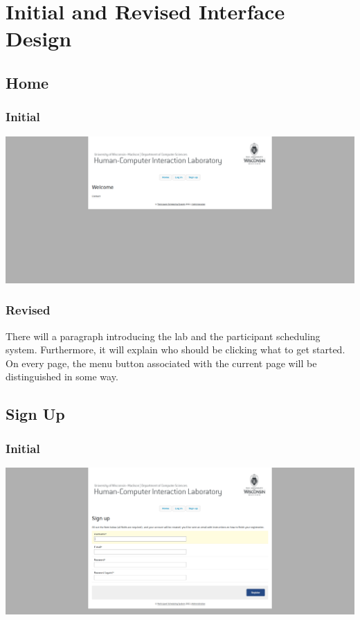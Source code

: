 \section{Initial and Revised Interface Design}

\subsection{Home}
\subsubsection{Initial}
\includegraphics[width=6in]{../other/initial-interface-design/home.png}
\subsubsection{Revised}
There will a paragraph introducing the lab and the participant scheduling system. Furthermore, it will explain who should be clicking what to get started. On every page, the menu button associated with the current page will be distinguished in some way.

\subsection{Sign Up}
\subsubsection{Initial}
\includegraphics[width=6in]{../other/initial-interface-design/sign-up.png}
